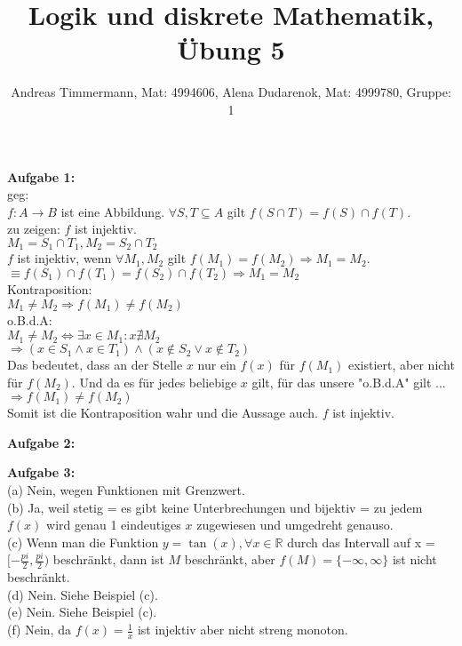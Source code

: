 \documentclass[a4paper]{scrartcl}
\title{Logik und diskrete Mathematik, Übung 5}
\author{Andreas Timmermann, Mat: 4994606, Alena Dudarenok, Mat: 4999780, Gruppe: 1}
\begin{document}
	\maketitle
	\begin{flushleft}
		\textbf{Aufgabe 1:}\\
		geg:\\
		$f:A\rightarrow B$ ist eine Abbildung. $\forall S,T\subseteq A$ gilt $f(S\cap T)=f(S)\cap f(T)$.\\
		zu zeigen: $f$ ist injektiv.\\[1em]
		$M_1 = S_1\cap T_1,M_2 = S_2\cap T_2$\\
		$f$ ist injektiv, wenn $\forall M_1,M_2$ gilt $f(M_1) = f(M_2)\Rightarrow M_1 = M_2$.\\ 
		$\equiv f(S_1)\cap f(T_1) = f(S_2)\cap f(T_2)\Rightarrow M_1 = M_2$\\[1em]
		Kontraposition:\\
		$M_1 \neq M_2 \Rightarrow f(M_1) \neq f(M_2)$\\
		o.B.d.A:\\
		$M_1 \neq M_2 \Leftrightarrow \exists x\in M_1: x\nexists M_2$\\
		$\Rightarrow (x\in S_1 \wedge x\in T_1) \wedge (x\notin S_2 \vee x\notin T_2)$\\
		Das bedeutet, dass an der Stelle $x$ nur ein $f(x)$ für $f(M_1)$ existiert, aber nicht für $f(M_2)$. Und da es für jedes beliebige $x$ gilt, für das unsere "o.B.d.A" gilt ...\\
		$\Rightarrow f(M_1)\neq f(M_2)$\\
		Somit ist die Kontraposition wahr und die Aussage auch. $f$ ist injektiv.
	\end{flushleft}
	\begin{flushleft}
		\textbf{Aufgabe 2:}\\
	\end{flushleft}
	\begin{flushleft}
		\textbf{Aufgabe 3:}\\		
		(a) Nein, wegen Funktionen mit Grenzwert.\\
		(b) Ja, weil stetig = es gibt keine Unterbrechungen und bijektiv = zu jedem $f(x)$ wird genau 1 eindeutiges  $x$ zugewiesen und umgedreht genauso.\\
		(c) Wenn man die Funktion $y = \tan(x), \forall x\in \mathbb{R}$ durch das Intervall auf x = $[-\frac{pi}{2},\frac{pi}{2})$ beschränkt, dann ist $M$ beschränkt, aber $f(M)=\{-\infty,\infty\}$ ist nicht beschränkt.\\
		(d) Nein. Siehe Beispiel (c).\\  
		(e) Nein. Siehe Beispiel (c).\\  
		(f) Nein, da  $f(x)=\frac{1}{x}$ ist injektiv aber nicht streng monoton. 
	\end{flushleft}
\end{document}
